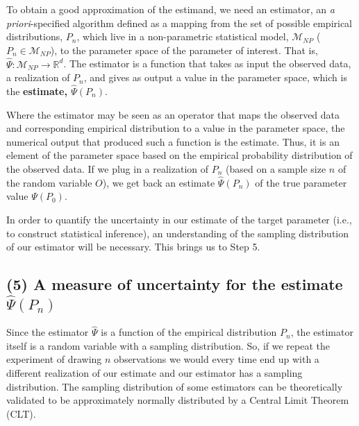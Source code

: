 \documentclass[
  12pt, krantz2,
]{book}
\theoremstyle{definition}
\theoremstyle{definition}
\theoremstyle{definition}
\newcommand{\1}{\mathbbm{1}}
\begin{document}
To obtain a good approximation of the estimand, we need an estimator, an \emph{a
priori}-specified algorithm defined as a mapping from the set of possible
empirical distributions, \(P_n\), which live in a non-parametric statistical
model, \(\mathcal{M}_{NP}\) (\(P_n \in \mathcal{M}_{NP}\)), to the parameter space
of the parameter of interest. That is, \(\hat{\Psi} : \mathcal{M}_{NP} \rightarrow \mathbb{R}^d\). The estimator is a function that takes as input
the observed data, a realization of \(P_n\), and gives as output a value in the
parameter space, which is the \textbf{estimate, \(\hat{\Psi}(P_n)\)}.

Where the estimator may be seen as an operator that maps the observed data and
corresponding empirical distribution to a value in the parameter space, the
numerical output that produced such a function is the estimate. Thus, it is an
element of the parameter space based on the empirical probability distribution
of the observed data. If we plug in a realization of \(P_n\) (based on a sample
size \(n\) of the random variable \(O\)), we get back an estimate \(\hat{\Psi}(P_n)\)
of the true parameter value \(\Psi(P_0)\).

In order to quantify the uncertainty in our estimate of the target parameter
(i.e., to construct statistical inference), an understanding of the sampling
distribution of our estimator will be necessary. This brings us to Step 5.

\hypertarget{a-measure-of-uncertainty-for-the-estimate-hatpsip_n}{%
\subsection*{\texorpdfstring{(5) A measure of uncertainty for the estimate \(\hat{\Psi}(P_n)\)}{(5) A measure of uncertainty for the estimate \textbackslash hat\{\textbackslash Psi\}(P\_n)}}\label{a-measure-of-uncertainty-for-the-estimate-hatpsip_n}}


Since the estimator \(\hat{\Psi}\) is a function of the empirical
distribution \(P_n\), the estimator itself is a random variable with a sampling
distribution. So, if we repeat the experiment of drawing \(n\) observations we
would every time end up with a different realization of our estimate and our
estimator has a sampling distribution. The sampling distribution of some estimators
can be theoretically validated to be approximately normally distributed by a
Central Limit Theorem (CLT).
\end{document}
